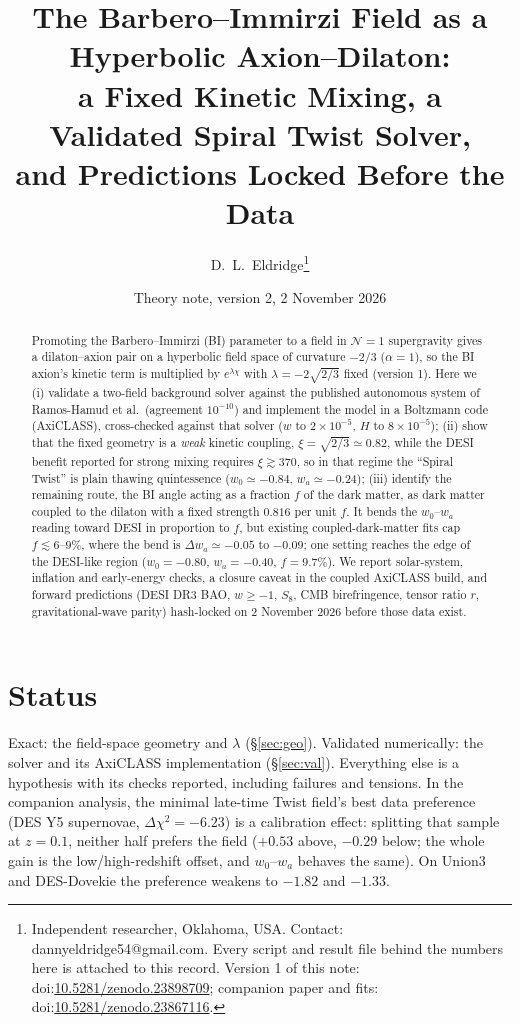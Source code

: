\documentclass[11pt]{article}
\title{\textbf{The Barbero--Immirzi Field as a Hyperbolic Axion--Dilaton:\\
a Fixed Kinetic Mixing, a Validated Spiral Twist Solver,\\ and Predictions Locked Before the Data}}
\author{D.~L.~Eldridge\thanks{Independent researcher, Oklahoma, USA. Contact: dannyeldridge54@gmail.com.
Every script and result file behind the numbers here is attached to this record. Version 1 of this note:
doi:\href{https://doi.org/10.5281/zenodo.23898709}{10.5281/zenodo.23898709}; companion paper and fits:
doi:\href{https://doi.org/10.5281/zenodo.23867116}{10.5281/zenodo.23867116}.}}
\date{Theory note, version 2, 2 November 2026}
\begin{document}
\sloppy
\maketitle

\begin{abstract}
Promoting the Barbero--Immirzi (BI) parameter to a field in $\mathcal N=1$ supergravity gives a dilaton--axion pair
on a hyperbolic field space of curvature $-2/3$ ($\alpha=1$), so the BI axion's kinetic term is multiplied by
$e^{\lambda\chi}$ with $\lambda=-2\sqrt{2/3}$ fixed (version 1). Here we (i) validate a two-field background solver
against the published autonomous system of Ramos-Hamud et al.\ (agreement $10^{-10}$) and implement the model in a
Boltzmann code (AxiCLASS), cross-checked against that solver ($w$ to $2\times10^{-5}$, $H$ to $8\times10^{-5}$);
(ii) show that the fixed geometry is a \emph{weak} kinetic coupling, $\xi=\sqrt{2/3}\simeq0.82$, while the DESI
benefit reported for strong mixing requires $\xi\gtrsim370$, so in that regime the ``Spiral Twist'' is plain thawing
quintessence ($w_0\simeq-0.84$, $w_a\simeq-0.24$); (iii) identify the remaining route, the BI angle acting as a
fraction $f$ of the dark matter, as dark matter coupled to the dilaton with a fixed strength $0.816$ per unit $f$.
It bends the $w_0$--$w_a$ reading toward DESI in proportion to $f$, but existing coupled-dark-matter fits cap
$f\lesssim6$--$9\%$, where the bend is $\Delta w_a\simeq-0.05$ to $-0.09$; one setting reaches the edge of the
DESI-like region ($w_0=-0.80$, $w_a=-0.40$, $f=9.7\%$). We report solar-system, inflation and early-energy checks,
a closure caveat in the coupled AxiCLASS build, and forward predictions (DESI DR3 BAO, $w\ge-1$, $S_8$, CMB
birefringence, tensor ratio $r$, gravitational-wave parity) hash-locked on 2 November 2026 before those data exist.
\end{abstract}

\section{Status}
Exact: the field-space geometry and $\lambda$ (\S\ref{sec:geo}). Validated numerically: the solver and its AxiCLASS
implementation (\S\ref{sec:val}). Everything else is a hypothesis with its checks reported, including failures and
tensions. In the companion analysis, the minimal late-time Twist field's best data preference (DES Y5 supernovae,
$\Delta\chi^2=-6.23$) is a calibration effect: splitting that sample at $z=0.1$, neither half prefers the field
($+0.53$ above, $-0.29$ below; the whole gain is the low/high-redshift offset, and $w_0$--$w_a$ behaves the same).
On Union3 and DES-Dovekie the preference weakens to $-1.82$ and $-1.33$.
\end{document}
